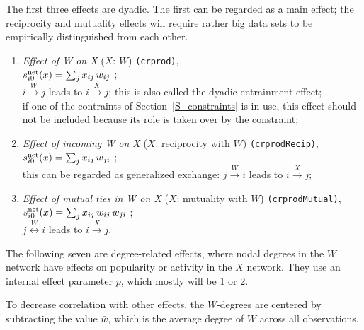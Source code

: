 \documentclass[a4paper,fleqn,11pt]{article}
\newcommand{\+}{\, + \,}
\newcommand{\vit}{\theenumi}
\newcounter{savenumi}
\begin{document}
The first three effects are dyadic. The first can be regarded
as a main effect; the reciprocity and mutuality effects
will require rather big data sets to be empirically distinguished
from each other.
\begin{enumerate}
 \item {\em Effect of W on X} ($X$: $W$)  \texttt{(crprod)},\\
 $s^{\rm net}_{i\vit}(x) = \sum_j x_{ij} \, w_{ij}  $ ;\\
 $i \stackrel{W}{\rightarrow} j$ leads to  $i \stackrel{X}{\rightarrow} j$;
 this is also called the dyadic entrainment effect;\\
 if one of the contraints of Section~\ref{S_constraints} is in use,
 this effect should not be included because its role is taken over by the
 constraint;

 \item {\em Effect of incoming W on X} ($X$: reciprocity with $W$)  \texttt{(crprodRecip)},\\
 $s^{\rm net}_{i\vit}(x) = \sum_j x_{ij} \, w_{ji}  $ ;\\
 this can be regarded as generalized exchange:
 $j \stackrel{W}{\rightarrow} i$ leads to  $i \stackrel{X}{\rightarrow} j$;

 \item {\em Effect of mutual ties in W on X} ($X$: mutuality with $W$)  \texttt{(crprodMutual)},\\
 $s^{\rm net}_{i\vit}(x) = \sum_j x_{ij} \, w_{ij} \, w_{ji}  $ ;\\
 $j \stackrel{W}{\leftrightarrow} i$ leads to  $i \stackrel{X}{\rightarrow} j$.
\setcounter{savenumi}{\value{enumi}}
\end{enumerate}
\smallskip
The following seven are degree-related effects, where nodal degrees
in the $W$ network have effects on popularity or activity in the
$X$  network. They use an internal effect parameter $p$, which
mostly will be 1 or 2.

To decrease correlation with other effects, the
$W$-degrees are centered by subtracting the value $\bar w$,
which is the average degree of $W$ across all observations.
\end{document}
